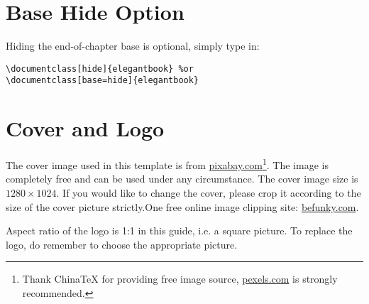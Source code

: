 \documentclass[fancy,blue,11pt]{elegantbook}
\begin{document}
\section{Base Hide Option}
Hiding the end-of-chapter base is optional, simply type in:
\begin{lstlisting}
\documentclass[hide]{elegantbook} %or
\documentclass[base=hide]{elegantbook}
\end{lstlisting}


\section{Cover and Logo}

The cover image used in this template is from \href{https://pixabay.com/en/tea-time-poetry-coffee-reading-3240766/}{pixabay.com}\footnote{Thank China\TeX{} for providing free image source, \href{https://www.pexels.com/}{pexels.com} is strongly recommended.}. The image is completely free and can be used under any circumstance. The cover image size is $1280 \times 1024$. If you would like to change the cover, please crop it according to the size of the cover picture strictly.One free online image clipping site: \href{https://www.befunky.com/create/crop-photo/}{befunky.com}.

Aspect ratio of the logo is 1:1 in this guide, i.e. a square picture. To replace the logo, do remember to choose the appropriate picture.
\end{document}
